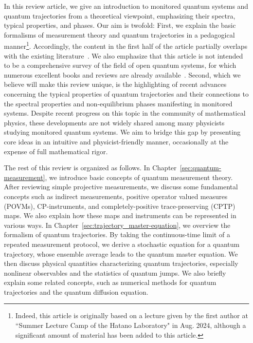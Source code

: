 \documentclass[preprint,pteplogo]{ptephy_v2}%
\numberwithin{equation}{section}
\theoremstyle{definition}
\begin{document}
In this review article, we give an introduction to monitored quantum systems and quantum trajectories from a theoretical viewpoint, emphasizing their spectra, typical properties, and phases.
Our aim is twofold:
First, we explain the basic formalisms of measurement theory and quantum trajectories in a pedagogical manner\footnote{
Indeed, this article is originally based on a lecture given by the first author at ``Summer Lecture Camp of the Hatano Laboratory" in Aug. 2024, although a significant amount of material has been added to this article.
}.
Accordingly, the content in the first half of the article partially overlaps with the existing literature~\cite{daley2014quantum, wiseman2009quantum, landi2024current, wolf2012quantum, watrous2018theory}.
We also emphasize that this article is not intended to be a comprehensive survey of the field of open quantum systems, for which numerous excellent books and reviews are already available~\cite{breuer2002theory, gardiner2004quantum, rivas2012open, daley2014quantum, wiseman2009quantum, breuer2016colloquium, sieberer2016keldysh, de2017dynamics, ashida2020non, weimer2021simulation, milz2021quantum, chruscinski2022dynamical, landi2022nonequilibrium, harrington2022engineered, landi2024current, sieberer2025universality, mori2023floquet, fisher2023random, albarelli2024pedagogical, fazio2025many}.
Second, which we believe will make this review unique, is the highlighting of recent advances concerning the typical properties of quantum trajectories and their connections to the spectral properties and non-equilibrium phases manifesting in monitored systems. 
Despite recent progress on this topic in the community of mathematical physics, these developments are not widely shared among many physicists studying monitored quantum systems.
We aim to bridge this gap by presenting core ideas in an intuitive and physicist-friendly manner, occasionally at the expense of full mathematical rigor.

The rest of this review is organized as follows.
In Chapter~\ref{sec:quantum-measurement}, we introduce basic concepts of quantum measurement theory. 
After reviewing simple projective measurements, we discuss some fundamental concepts such as indirect measurements, positive operator valued measures (POVMs), CP-instruments, and completely-positive trace-preserving (CPTP) maps.
We also explain how these maps and instruments can be represented in various ways.
In Chapter~\ref{sec:trajectory_master-equation}, we overview the formalism of quantum trajectories.
By taking the continuous-time limit of a repeated measurement protocol, we derive a stochastic equation for a quantum trajectory, whose ensemble average leads to the quantum master equation.
We then discuss physical quantities characterizing quantum trajectories, especially nonlinear observables and the statistics of quantum jumps.
We also briefly explain some related concepts, such as numerical methods for quantum trajectories and the quantum diffusion equation.
\end{document}

